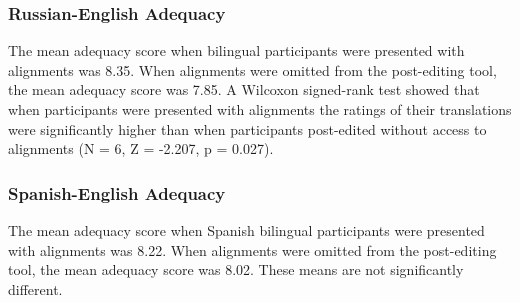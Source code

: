 

\subsubsection{Russian-English Adequacy}


The mean adequacy score when bilingual participants were presented with alignments was 8.35.
%
When alignments were omitted from the post-editing tool, the mean adequacy score was 7.85. 
%
A Wilcoxon signed-rank test \citep{1945_Wilcoxon} showed that when participants were presented with alignments the ratings of their translations were significantly higher than when participants post-edited without access to alignments (N = 6, Z = -2.207, p = 0.027).



\subsubsection{Spanish-English Adequacy}

The mean adequacy score when Spanish bilingual participants were presented with alignments was 8.22. When alignments were omitted from the post-editing tool, the mean adequacy score was 8.02. These means are not significantly different.



%



